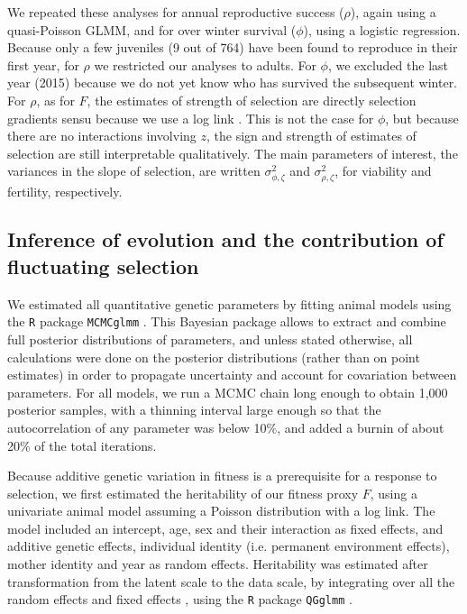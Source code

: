 We repeated these analyses for annual reproductive success ($\rho$), again using a quasi-Poisson GLMM, and for over winter survival ($\phi$), using a logistic regression. Because only a few juveniles (9 out of 764) have been found to reproduce in their first year, for $\rho$ we restricted our analyses to adults.
For $\phi$, we excluded the last year (2015) because we do not yet know who has survived the subsequent winter. For $\rho$, as for $F$, the estimates of strength of selection are directly selection gradients sensu \parencite{Lande1983} because we use a log link \parencite{Smouse1999, Firth2015}. This is not the case for $\phi$, but because there are no interactions involving $z$, the sign and strength of estimates of selection are still interpretable qualitatively. 
The main parameters of interest, the variances in the slope of selection, are written  $\sigma_{\phi,\zeta}^2$ and  $\sigma_{\rho,\zeta}^2$, for viability and fertility, respectively. 

\subsection*{Inference of evolution and the contribution of fluctuating selection}
We estimated all quantitative genetic parameters by fitting animal models \parencite{Henderson1950,Henderson1975,Henderson1976} using the \texttt{R} package \texttt{MCMCglmm} \parencite{Hadfield2010a}. This Bayesian package allows to extract and combine full posterior distributions of parameters, and unless stated otherwise, all calculations were done on the posterior distributions (rather than on point estimates) in order to propagate uncertainty and account for covariation between parameters. For all models, we run a MCMC chain long enough to obtain 1,000 posterior samples, with a thinning interval large enough so that the autocorrelation of any parameter was below 10\%, and added a burnin of about 20\% of the total iterations. 

Because additive genetic variation in fitness is a prerequisite for a response to selection, we first estimated the heritability of our fitness proxy $F$, using a univariate animal model assuming a Poisson distribution with a log link. The model included an intercept, age, sex and their interaction as fixed effects, and additive genetic effects, individual identity (i.e. permanent environment effects), mother identity and year as random effects. Heritability was estimated after transformation from the latent scale to the data scale, by integrating over all the random effects and fixed effects \parencite{Morrissey2015,DeVillemereuil2016}, using the \texttt{R} package \texttt{QGglmm} \parencite{DeVillemereuil2016}.

